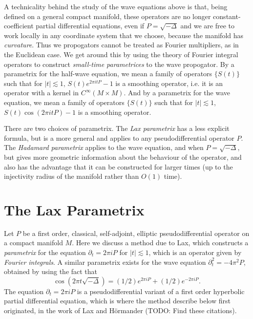 A technicality behind the study of the wave equations above is that, being defined on a general compact manifold, these operators are no longer constant-coefficient partial differential equations, even if $P = \sqrt{-\Delta}$ and we are free to work locally in any coordinate system that we choose, because the manifold has \emph{curvature}. Thus we propogators cannot be treated as Fourier multipliers, as in the Euclidean case. We get around this by using the theory of Fourier integral operators to construct \emph{small-time parametrices} to the wave propogator. By a parametrix for the half-wave equation, we mean a family of operators $\{ S(t) \}$ such that for $|t| \lesssim 1$, $S(t) e^{2 \pi i t P} - 1$ is a smoothing operator, i.e. it is an operator with a kernel in $C^\infty(M \times M)$. And by a parametrix for the wave equation, we mean a family of operators $\{ S(t) \}$ such that for $|t| \lesssim 1$, $S(t) \cos(2 \pi i t P) - 1$ is a smoothing operator.

There are two choices of parametrix. The \emph{Lax parametrix} has a less explicit formula, but is a more general and applies to any pseudodifferential operator $P$. The \emph{Hadamard parametrix} applies to the wave equation, and when $P = \sqrt{-\Delta}$, but gives more geometric information about the behaviour of the operator, and also has the advantage that it can be constructed for larger times (up to the injectivity radius of the manifold rather than $O(1)$ time).






\section{The Lax Parametrix}

Let $P$ be a first order, classical, self-adjoint, elliptic pseudodifferential operator on a compact manifold $M$. Here we discuss a method due to Lax, which constructs a \emph{parametrix} for the equation $\partial_t = 2 \pi i P$ for $|t| \lesssim 1$, which is an operator given by \emph{Fourier integrals}. A similar parametrix exists for the wave equation $\partial_t^2 = - 4\pi^2 P$, obtained by using the fact that
%
\[ \cos\left( 2 \pi t \sqrt{-\Delta} \right) = (1/2) e^{2 \pi i P} + (1/2) e^{-2 \pi i P}. \]
%
The equation $\partial_t = 2 \pi i P$ is a pseudodifferential variant of a first order hyperbolic partial differential equation, which is where the method describe below first originated, in the work of Lax and H\"{o}rmander (TODO: Find these citations).

